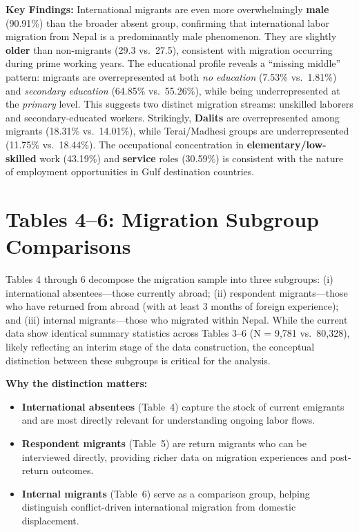 \documentclass[12pt,letterpaper]{article}
\begin{document}
\noindent\textbf{Key Findings:} International migrants are even more overwhelmingly \textbf{male} (90.91\%) than the broader absent group, confirming that international labor migration from Nepal is a predominantly male phenomenon. They are slightly \textbf{older} than non-migrants (29.3 vs.\ 27.5), consistent with migration occurring during prime working years. The educational profile reveals a ``missing middle'' pattern: migrants are overrepresented at both \textit{no education} (7.53\% vs.\ 1.81\%) and \textit{secondary education} (64.85\% vs.\ 55.26\%), while being underrepresented at the \textit{primary} level. This suggests two distinct migration streams: unskilled laborers and secondary-educated workers. Strikingly, \textbf{Dalits} are overrepresented among migrants (18.31\% vs.\ 14.01\%), while Terai/Madhesi groups are underrepresented (11.75\% vs.\ 18.44\%). The occupational concentration in \textbf{elementary/low-skilled} work (43.19\%) and \textbf{service} roles (30.59\%) is consistent with the nature of employment opportunities in Gulf destination countries.


\section{Tables 4--6: Migration Subgroup Comparisons}

Tables 4 through 6 decompose the migration sample into three subgroups: (i) international absentees---those currently abroad; (ii) respondent migrants---those who have returned from abroad (with at least 3 months of foreign experience); and (iii) internal migrants---those who migrated within Nepal. While the current data show identical summary statistics across Tables 3--6 (N = 9,781 vs.\ 80,328), likely reflecting an interim stage of the data construction, the conceptual distinction between these subgroups is critical for the analysis.

\noindent\textbf{Why the distinction matters:}
\begin{itemize}[nosep]
    \item \textbf{International absentees} (Table~4) capture the stock of current emigrants and are most directly relevant for understanding ongoing labor flows.
    \item \textbf{Respondent migrants} (Table~5) are return migrants who can be interviewed directly, providing richer data on migration experiences and post-return outcomes.
    \item \textbf{Internal migrants} (Table~6) serve as a comparison group, helping distinguish conflict-driven international migration from domestic displacement.
\end{itemize}
\end{document}
